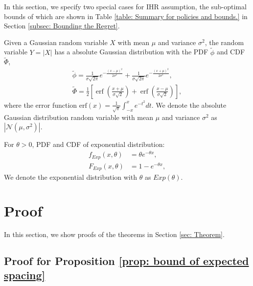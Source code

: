 In this section, we specify two special cases for IHR assumption, the sub-optimal bounds of which are shown in Table \ref{table: Summary for policies and bounds.} in Section \ref{subsec: Bounding the Regret}.

\begin{defi}
\label{defi: AbsGau}
Given a Gaussian random variable $X$ with mean $\mu$ and variance $\sigma^2$, the random variable $Y = |X|$ has a absolute Gaussian distribution with the PDF $\tilde{\phi}$ and CDF $\tilde{\Phi}$,
\begin{align}
    \tilde{\phi} = \frac{1}{\sigma \sqrt{2 \pi}} e^{-\frac{(x-\mu)^{2}}{2 \sigma^{2}}}+\frac{1}{\sigma \sqrt{2 \pi}} e^{-\frac{(x+\mu)^{2}}{2 \sigma^{2}}},\\
    \tilde{\Phi} = \frac{1}{2}\left[\operatorname{erf}\left(\frac{x+\mu}{\sigma \sqrt{2}}\right)+\operatorname{erf}\left(\frac{x-\mu}{\sigma \sqrt{2}}\right)\right],
\end{align}
where the error function $\text{erf}\left(x\right)= \frac{1}{\sqrt{\pi}} \int_{-x}^{x} e^{-t^2} dt$. We denote the absolute Gaussian distribution random variable with mean $\mu$ and variance $\sigma^2$ as $|\mathcal{N}(\mu, \sigma^2)|$.
\end{defi}

\begin{defi} 
\label{defi: Exp}
For $\theta > 0$, PDF and CDF of exponential distribution:
\begin{align}
    \label{Expon PDF}
    f_{Exp}\left(x, \theta\right) &= \theta e^{-\theta x},\\
    \label{expon CDF}
    F_{Exp}\left(x, \theta\right) &= 1 - e^{-\theta x},
\end{align}
We denote the exponential distribution with $\theta$ as $Exp(\theta)$.
\end{defi}




\section{Proof}
\label{app-sec: Proof}

In this section, we show proofs of the theorems in Section \ref{sec: Theorem}. 

\subsection{Proof for Proposition \ref{prop: bound of expected spacing}}


